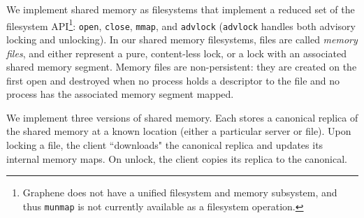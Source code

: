 %
We implement shared memory as filesystems that implement a
reduced set of the filesystem API\footnote{Graphene does not have a
unified filesystem and memory subsystem, and
thus \texttt{munmap} is not currently available as a filesystem operation.
}:
\texttt{open}, \texttt{close}, \texttt{mmap}, and \texttt{advlock}
(\texttt{advlock} handles both advisory locking and unlocking).
%
In our shared memory filesystems, files are called \emph{memory files}, and
either represent a pure, content-less lock, or a lock with an associated
shared memory segment.
% 
Memory files are non-persistent: they are created on the first open and
destroyed when no process holds a descriptor to the file and no process has the
associated memory segment mapped.


We implement three versions of shared memory.
%
Each stores a canonical replica of the shared memory at a known
location (either a particular server or file).
%
Upon locking a file, the client ``downloads" the canonical replica and updates
its internal memory maps.
%
On unlock, the client copies its replica to the canonical.
%

